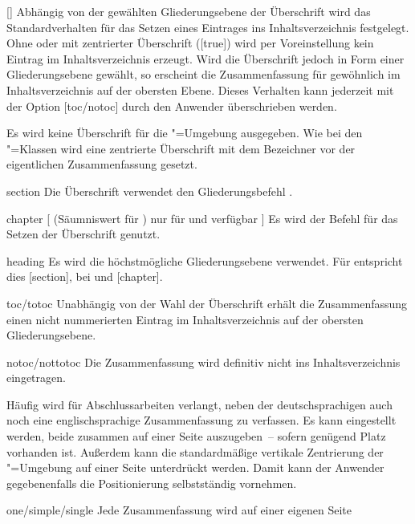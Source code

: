\begin{Declaration}{[\PSet]}
Abhängig von der gewählten Gliederungsebene der Überschrift wird das 
Standardverhalten für das Setzen eines Eintrages ins Inhaltsverzeichnis 
festgelegt. Ohne oder mit zentrierter Überschrift ([true]) 
wird per Voreinstellung kein Eintrag im Inhaltsverzeichnis erzeugt. Wird die 
Überschrift jedoch in Form einer Gliederungsebene gewählt, so erscheint die 
Zusammenfassung für gewöhnlich im Inhaltsverzeichnis auf der obersten Ebene. 
Dieses Verhalten kann jederzeit mit der Option [toc/notoc] 
durch den Anwender überschrieben werden.
%
\begin{values}
  Es wird keine Überschrift für die "=Umgebung ausgegeben.
  Wie bei den \KOMAScript"=Klassen wird eine zentrierte Überschrift mit dem 
  Bezeichner  vor der eigentlichen Zusammenfassung gesetzt.
\item[section]
  Die Überschrift verwendet den Gliederungsbefehl .
\item[chapter][%
    (Säumniswert für \Class*{tudscrbook})
    nur für \Class*{tudscrreprt} und \Class*{tudscrbook} verfügbar%
  ]
  Es wird der Befehl  für das Setzen der Überschrift genutzt. 
\item[heading]
  Es wird die höchstmögliche Gliederungsebene verwendet. Für 
   entspricht dies [section], bei 
   und  [chapter].
\item[toc/totoc]
  Unabhängig von der Wahl der Überschrift erhält die Zusammenfassung einen nicht
  nummerierten Eintrag im Inhaltsverzeichnis auf der obersten Gliederungsebene. 
\item[notoc/nottotoc]
  Die Zusammenfassung wird definitiv nicht ins Inhaltsverzeichnis eingetragen.
\end{values}
%
Häufig wird für Abschlussarbeiten verlangt, neben der deutschsprachigen 
auch noch eine englischsprachige Zusammenfassung zu verfassen. Es kann 
eingestellt werden, beide zusammen auf einer Seite auszugeben~-- sofern 
genügend Platz vorhanden ist. Außerdem kann die standardmäßige vertikale 
Zentrierung der "=Umgebung auf einer Seite unterdrückt 
werden. Damit kann der Anwender gegebenenfalls die Positionierung selbstständig 
vornehmen. 
%
\begin{values}
\item[one/simple/single]Jede Zusammenfassung wird auf einer eigenen Seite

\end{values}
\end{Declaration}
